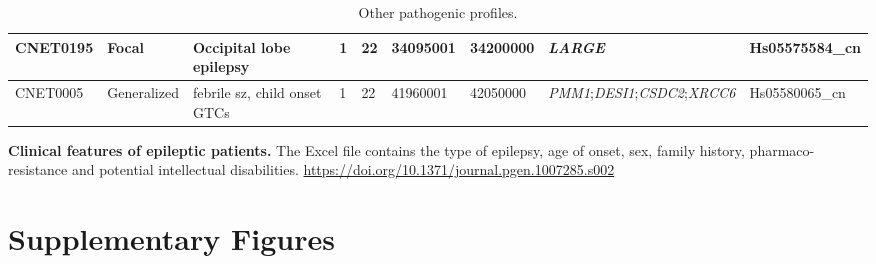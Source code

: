 \begin{table}[htp]
{\begin{tabular}{|l|l|p{}|l|l|l|l|l|l|}
      \hline
      CNET0195       & Focal                & Occipital lobe epilepsy                                               & 1                   & 22         & 34095001         & 34200000       & {\it LARGE}                  & Hs05575584\_cn      \\
      \hline
      CNET0005       & Generalized          & febrile sz, child onset GTCs                                          & 1                   & 22         & 41960001         & 42050000       & {\it PMM1};{\it DESI1};{\it CSDC2};{\it XRCC6} & Hs05580065\_cn      \\
      \hline
    \end{tabular}
  }
  \caption{Other pathogenic profiles.}
  \label{tab:supp}
\end{table}

\begin{table}[htp]
  \caption[Clinical features of epileptic patients.]{{\bf Clinical features of epileptic patients.} {\small The Excel file contains the type of epilepsy, age of onset, sex, family history, pharmaco-resistance and potential intellectual disabilities. \url{https://doi.org/10.1371/journal.pgen.1007285.s002}}}
  \label{tab:clinical}
\end{table}

\clearpage

\section*{Supplementary Figures}


